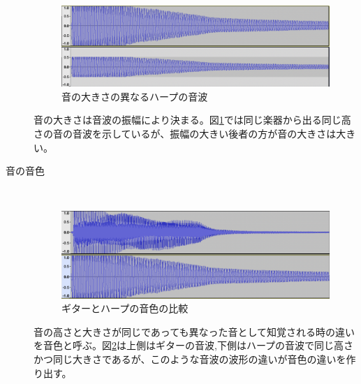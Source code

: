 \begin{description}
\begin{figure}[H]
\begin{center}
\includegraphics[width=0.7\hsize]{figure/c4_harp_loudness.png}
\caption{音の大きさの異なるハープの音波}
\label{fig:loudness}
\end{center}
\end{figure}

音の大きさは音波の振幅により決まる。図\ref{fig:loudness}では同じ楽器から出る同じ高さの音の音波を示しているが、振幅の大きい後者の方が音の大きさは大きい。

\item[音の音色]\mbox{}\\

\begin{figure}[H]
\begin{center}
\includegraphics[width=0.7\hsize]{figure/c4_guitar_harp.png}
\caption{ギターとハープの音色の比較}
\label{fig:guitar_harp_comp}
\end{center}
\end{figure}

音の高さと大きさが同じであっても異なった音として知覚される時の違いを音色と呼ぶ。図\ref{fig:guitar_harp_comp}は上側はギターの音波,下側はハープの音波で同じ高さかつ同じ大きさであるが、このような音波の波形の違いが音色の違いを作り出す。

\end{description}